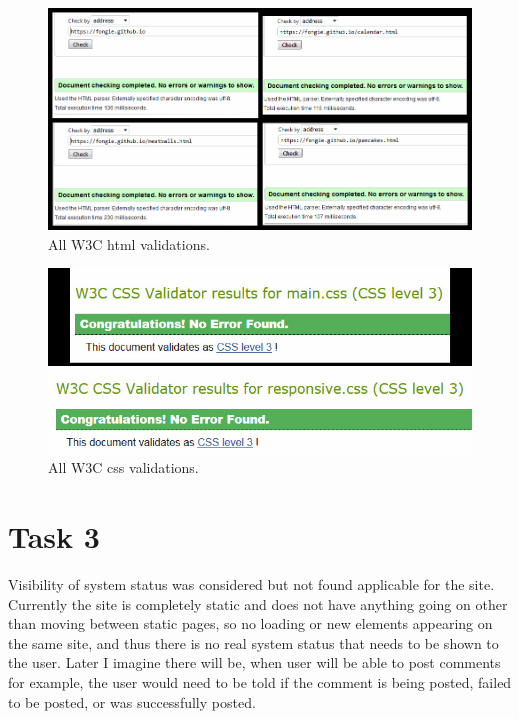 \documentclass[a4paper]{scrreprt}
\begin{document}
\begin{figure}[h!]
  \begin{center}
    \includegraphics[scale=0.41]{htmlval/html_checks.jpeg}
    \caption{All W3C html validations.}
    \label{fig:htmlvalidations}
  \end{center}
\end{figure}

\begin{figure}[h!]
  \begin{center}
    \includegraphics[scale=0.41]{cssval/css_checks.jpeg}
    \caption{All W3C css validations.}
    \label{fig:cssvalidations}
  \end{center}
\end{figure}


\section{Task 3}

Visibility of system status was considered but not found applicable for the site. Currently the site is completely static and does not have anything going on other than moving between static pages, so no loading or new elements appearing on the same site, and thus there is no real system status that needs to be shown to the user. Later I imagine there will be, when user will be able to post comments for example, the user would need to be told if the comment is being posted, failed to be posted, or was successfully posted.
\end{document}
